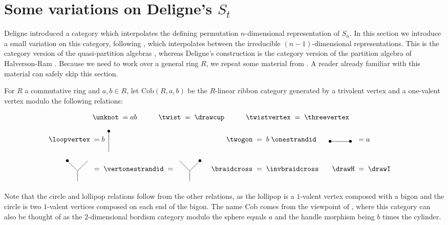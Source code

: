 \documentclass[12pt]{amsart}
\begin{document}
\section{Some variations on Deligne's \texorpdfstring{$S_t$}{S t}} \label{sec:StDef}

Deligne introduced a category which interpolates the defining permutation $n$-dimensional representation of $S_n$. In this section we introduce a small variation on this category, following \cite[\S6.2.1]{MR5101335}, which interpolates between the irreducible $(n-1)$-dimensional representations. This is the category version of the quasi-partition algebras \cite{MR3177889,MR4756485}, whereas Deligne's construction is the category version of the partition algebra of Halverson-Ram \cite{MR2143201}. Because we need to work over a general ring $R$, we repeat some material from \cite{2007.11640,MR5101335}. A reader already familiar with this material can safely skip this section.


\begin{definition}
For $R$ a commutative ring and $a,b \in R$, let $\mathrm{Cob}(R,a,b)$ be the $R$-linear ribbon category generated by a trivalent vertex and a one-valent vertex modulo the following relations:

\begin{align*}
    \unknot\; &= ab  &\qquad
      \twist\; &=  \;\drawcup&\qquad
        \twistvertex\; &=  \;\threevertex
\end{align*}
\begin{align*}
    \loopvertex\;&= b \onevalent&
      \twogon\;&= \;b \; \onestrandid& \dogbone \;&= a &\\
	\leftunitvertex \; &= \; \vertonestrandid \; = \; \rightunitvertex & \braidcross \; &= \; \invbraidcross &\drawH \; &= \; \drawI \; \\
\end{align*}
\end{definition}

Note that the circle and lollipop relations follow from the other relations, as the lollipop is a $1$-valent vertex composed with a bigon and the circle is two $1$-valent vertices composed on each end of the bigon. The name $\mathrm{Cob}$ comes from the viewpoint of \cite{2007.11640}, where this category can also be thought of as the $2$-dimensional bordism category modulo the sphere equals $a$ and the handle morphism being $b$ times the cylinder.
\end{document}
